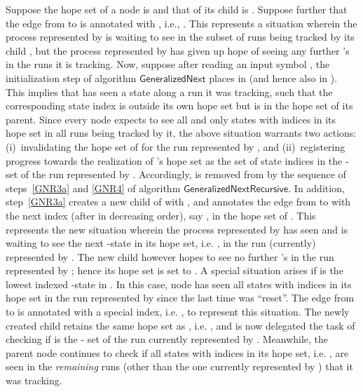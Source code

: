 \documentclass[3p]{elsarticle}
\newcommand{\algo}[1]{\ensuremath{\textsf{{#1}}}}
\begin{document}
Suppose the hope set of a node  is  and that of its child
 is .  Suppose further that the edge from  to  is
annotated with , i.e., .  This
represents a situation wherein the process represented by  is
waiting to see  in the subset of runs being tracked by its
child , but the process represented by  has given up hope of
seeing any further 's in the runs it is tracking.  Now,
suppose after reading an input symbol , the initialization
step of algorithm \algo{GeneralizedNext} places  in
 (and hence also in ).  This implies that
 has seen a state along a run it was tracking, such that the
corresponding state index is outside its own hope set but is in the
hope set of its parent.  Since every node expects to see all and only
states with indices in its hope set in all runs being tracked by it,
the above situation warrants two actions: (i)~invalidating the hope
set of  for the run represented by , and
(ii)~registering progress towards the realization of 's hope set as
the set of state indices in the -set of the run represented by
.  Accordingly,  is removed from  by
the sequence of steps~\ref{GNR3a} and \ref{GNR4} of algorithm
\algo{GeneralizedNextRecursive}.  In addition, step~\ref{GNR3a}
creates a new child  of  with , and
annotates the edge from  to  with the next index (after 
in decreasing order), say , in the hope set of .  This
represents the new situation wherein the process represented by 
has seen  and is waiting to see the next -state in its
hope set, i.e. , in the run (currently) represented by
.  The new child  however hopes to see no further
's in the run represented by ; hence its hope set is
set to .  A special situation arises if
 is the lowest indexed -state in .  In this
case, node  has seen all states with indices in its hope set in the
run represented by  since the last time  was ``reset''.
The edge from  to  is annotated with a special index, i.e. ,
to represent this situation.  The newly created child  retains the
same hope set as , i.e. , and is now delegated the task of
checking if  is the - set of the run currently
represented by .  Meanwhile, the parent node  continues to
check if all states with indices in its hope set, i.e. , are
seen in the \emph{remaining} runs (other than the one currently
represented by ) that it was tracking.
\end{document}
